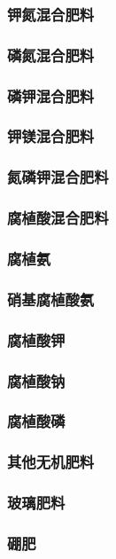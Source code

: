 \documentclass[UTF8]{../../ApplicationUniverse}
\begin{document}
    \subsubsection{钾氮混合肥料}
    \subsubsection{磷氮混合肥料}
    \subsubsection{磷钾混合肥料}
    \subsubsection{钾镁混合肥料}
    \subsubsection{氮磷钾混合肥料}
    \subsubsection{腐植酸混合肥料}
        \subsubsection{腐植氨}
        \subsubsection{硝基腐植酸氨}
        \subsubsection{腐植酸钾}
        \subsubsection{腐植酸钠}
        \subsubsection{腐植酸磷}
\subsubsection{其他无机肥料}
    \subsubsection{玻璃肥料}
    \subsubsection{硼肥}
\end{document}
